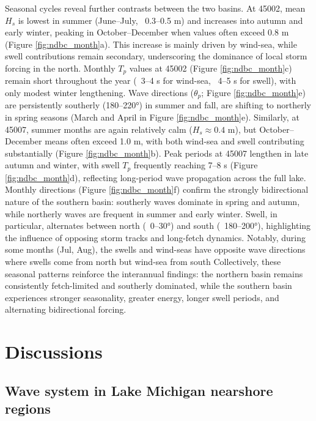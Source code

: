 Seasonal cycles reveal further contrasts between the two basins. At 45002, mean
$H_s$ is lowest in summer (June–July, ~0.3–0.5 m) and increases into autumn and
early winter, peaking in October–December when values often exceed 0.8 m (Figure
\ref{fig:ndbc_month}a). This increase is mainly driven by wind-sea, while swell
contributions remain secondary, underscoring the dominance of local storm
forcing in the north. Monthly $T_p$ values at 45002 (Figure
\ref{fig:ndbc_month}c) remain short throughout the year (~3–4 s for wind-sea,
~4–5 s for swell), with only modest winter lengthening. Wave directions
($\theta_p$; Figure \ref{fig:ndbc_month}e) are persistently southerly (180–220°)
in summer and fall, are shifting to northerly in spring seasons (\eg March and
April in Figure \ref{fig:ndbc_month}e). Similarly, at 45007, summer months are
again relatively calm ($H_s \approx 0.4$ m), but October–December means often
exceed 1.0 m, with both wind-sea and swell contributing substantially (Figure
\ref{fig:ndbc_month}b). Peak periods at 45007 lengthen in late autumn and
winter, with swell $T_p$ frequently reaching 7–8 s (Figure
\ref{fig:ndbc_month}d), reflecting long-period wave propagation across the full
lake. Monthly directions (Figure \ref{fig:ndbc_month}f) confirm the strongly
bidirectional nature of the southern basin: southerly waves dominate in spring
and autumn, while northerly waves are frequent in summer and early winter.
Swell, in particular, alternates between north (~0–30°) and south (~180–200°),
highlighting the influence of opposing storm tracks and long-fetch dynamics.
Notably, during some months (\eg Jul, Aug), the swells and wind-seas have
opposite wave directions where swells come from north but wind-sea from south
Collectively, these seasonal patterns reinforce the interannual findings: the
northern basin remains consistently fetch-limited and southerly dominated, while
the southern basin experiences stronger seasonality, greater energy, longer
swell periods, and alternating bidirectional forcing.

\section{Discussions}
\label{c4_Discussions}

\subsection{Wave system in Lake Michigan nearshore regions}
\label{Wave system in Lake Michigan nearshore regions}

